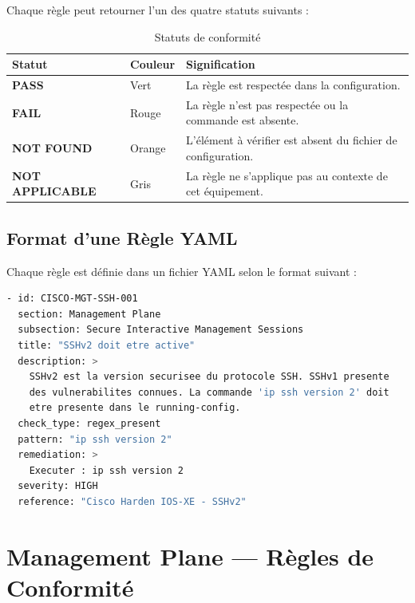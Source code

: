 \documentclass[12pt, a4paper]{report}
\begin{document}
Chaque règle peut retourner l'un des quatre statuts suivants :

\begin{table}[H]
  \centering
  \caption{Statuts de conformité}
  \begin{tabularx}{\textwidth}{>{\bfseries}l l X}
    \toprule
    \rowcolor{tableHeader}\color{white}\textbf{Statut} & \color{white}\textbf{Couleur} & \color{white}\textbf{Signification} \\
    \midrule
    \rowcolor{rulePass} PASS & Vert & La règle est respectée dans la configuration. \\
    \rowcolor{ruleFail} FAIL & Rouge & La règle n'est pas respectée ou la commande est absente. \\
    \rowcolor{ruleWarn} NOT FOUND & Orange & L'élément à vérifier est absent du fichier de configuration. \\
    \rowcolor{tableRowB} NOT APPLICABLE & Gris & La règle ne s'applique pas au contexte de cet équipement. \\
    \bottomrule
  \end{tabularx}
\end{table}

\section{Format d'une Règle YAML}

Chaque règle est définie dans un fichier YAML selon le format suivant :

\begin{lstlisting}[language=bash, caption={Exemple de règle YAML pour SSHv2}]
- id: CISCO-MGT-SSH-001
  section: Management Plane
  subsection: Secure Interactive Management Sessions
  title: "SSHv2 doit etre active"
  description: >
    SSHv2 est la version securisee du protocole SSH. SSHv1 presente
    des vulnerabilites connues. La commande 'ip ssh version 2' doit
    etre presente dans le running-config.
  check_type: regex_present
  pattern: "ip ssh version 2"
  remediation: >
    Executer : ip ssh version 2
  severity: HIGH
  reference: "Cisco Harden IOS-XE - SSHv2"
\end{lstlisting}

\chapter{Management Plane — Règles de Conformité}
\end{document}
